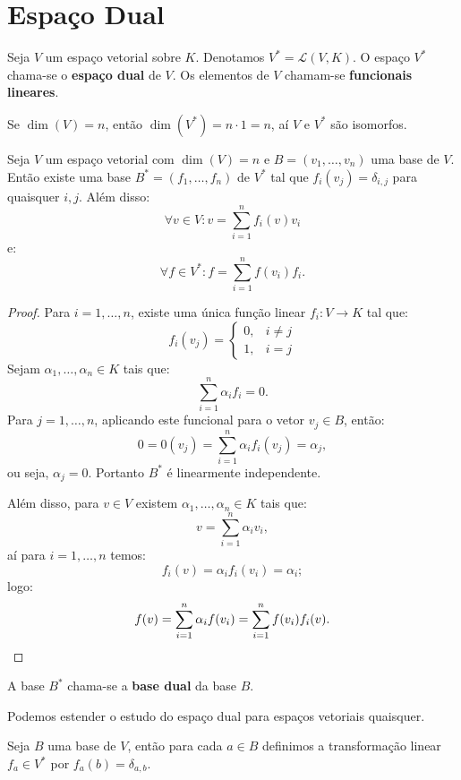 \documentclass[11pt,twoside,a4paper]{book}
\begin{document}
\section{Espaço Dual}

\begin{definicao}
Seja $V$ um espaço vetorial sobre $K$. Denotamos $V^*=\mathcal{L}(V,K)$. O espaço $V^*$ chama-se o \textbf{espaço dual} de $V$. Os elementos de $V$ chamam-se \textbf{funcionais lineares}.
\end{definicao}

\noindent
Se $\dim(V)=n$, então $\dim(V^*)=n\cdot 1=n$, aí $V$ e $V^*$ são isomorfos.

\begin{teorema}\label{basedual}
Seja $V$ um espaço vetorial com $\dim(V)=n$ e $B=(v_1,\dots,v_n)$ uma base de $V$. Então existe uma base $B^*=(f_1,\dots,f_n)$ de $V^*$ tal que $f_i(v_j)=\delta_{i,j}$ para quaisquer $i,j$. Além disso:
\[
\forall v\in V:v=\sum_{i=1}^nf_i(v)v_i
\]
e:
\[
\forall f\in V^*:f=\sum_{i=1}^nf(v_i)f_i.
\]
\end{teorema}
\begin{proof}
Para $i=1,\dots,n$, existe uma única função linear $f_i:V\rightarrow K$ tal que:
\[
f_i(v_j)=\left\{\begin{array}{rl}0,&i\neq j\\1,&i=j\end{array}\right.
\]
Sejam $\alpha_1,\dots,\alpha_n\in K$ tais que:
\[
\sum_{i=1}^n\alpha_if_i=0.
\]
Para $j=1,\dots,n$, aplicando este funcional para o vetor $v_j\in B$, então:
\[
0=0(v_j)=\sum_{i=1}^n\alpha_if_i(v_j)=\alpha_j,
\]
ou seja, $\alpha_j=0$. Portanto $B^*$ é linearmente independente.

\medskip
\noindent
Além disso, para $v\in V$ existem $\alpha_1,\dots,\alpha_n\in K$ tais que:
\[
v=\sum_{i=1}^n\alpha_iv_i,
\]
aí para $i=1,\dots,n$ temos:
\[
f_i(v)=\alpha_if_i(v_i)=\alpha_i;
\]
logo:
\[
f(v)=\sum_{i=1}^n\alpha_if(v_i)=\sum_{i=1}^nf(v_i)f_i(v). \qedhere
\] 
\end{proof}

\begin{definicao}
A base $B^*$ chama-se a \textbf{base dual} da base $B$.
\end{definicao}

\noindent
Podemos estender o estudo do espaço dual para espaços vetoriais quaisquer.

\begin{definicao}
Seja $B$ uma base de $V$, então para cada $a\in B$ definimos a transformação linear $f_a\in V^*$ por $f_a(b)=\delta_{a,b}$.
\end{definicao}
\end{document}
